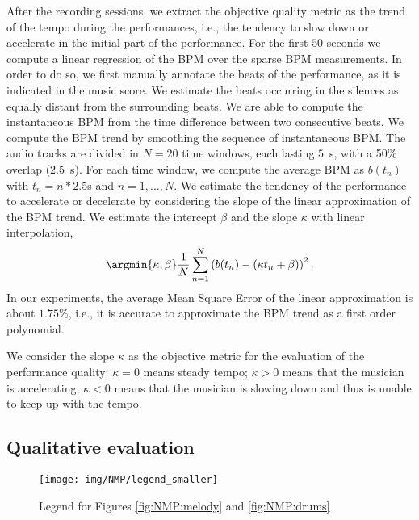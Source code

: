 After the recording sessions, we extract the objective quality metric as the trend of the tempo during the performances, i.e., the tendency to slow down or accelerate in the initial part of the performance. For the first $50$ seconds we compute a linear regression of the BPM over the sparse BPM measurements. In order to do so, we first manually annotate the beats of the performance, as it is indicated in the music score. We estimate the beats occurring in the silences as equally distant from the surrounding beats. We are able to compute the instantaneous BPM from the time difference between two consecutive beats. We compute the BPM trend by smoothing the sequence of instantaneous BPM. The audio tracks are divided in $N=20$ time windows, each lasting $5$~s, with a 50\% overlap ($2.5$~s). For each time window, we compute the average BPM as $b(t_n)$ with $t_n=n*2.5$s and $n=1,...,N$. We estimate the tendency of the performance to accelerate or decelerate by considering the slope of the linear approximation of the BPM trend. We estimate the intercept $\beta$ and the slope $\kappa$ with linear interpolation, 
\begin{equation}
\argmin{\kappa, \beta} \frac{1}{N} \sum_{n=1}^{N} \left(b(t_n)-(\kappa t_n + \beta)\right)^2.
\end{equation}
In our experiments, the average Mean Square Error of the linear approximation is about $1.75$\%, i.e., it is accurate to approximate the BPM trend as a first order polynomial.

We consider the slope $\kappa$ as the objective metric for the evaluation of the performance quality: $\kappa=0$ means steady tempo; $\kappa>0$ means that the musician is accelerating; $\kappa<0$ means that the musician is slowing down and thus is unable to keep up with the tempo. 
%

\subsection{Qualitative evaluation}\label{sec:NMP:qualResults}
\begin{wrapfigure}{R}{0.3\textwidth}
  \begin{center}
     \texttt{[image: img/NMP/legend\_smaller]}
  \end{center}
  \caption{Legend for Figures \ref{fig:NMP:melody} and \ref{fig:NMP:drums} }
 \label{fig:NMP:legend} 
\end{wrapfigure}

